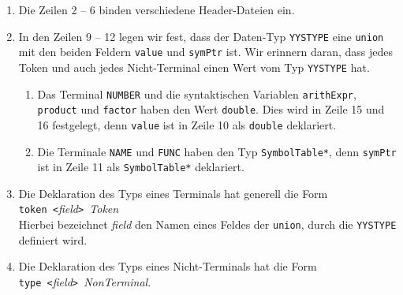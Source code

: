\begin{enumerate}
\item Die Zeilen 2 -- 6 binden verschiedene Header-Dateien ein.
\item In den Zeilen 9 -- 12 legen wir fest, dass der Daten-Typ \texttt{YYSTYPE} eine
      \texttt{union} mit den beiden Feldern \texttt{value} und \texttt{symPtr} ist.
      Wir erinnern daran, dass jedes Token und auch jedes Nicht-Terminal einen Wert vom
      Typ \texttt{YYSTYPE} hat.  
      \begin{enumerate}
      \item Das Terminal \texttt{NUMBER} und die syntaktischen Variablen
            \texttt{arithExpr}, \texttt{product} und \texttt{factor} haben den Wert
            \texttt{double}.  Dies wird in Zeile 15 und 16 festgelegt, denn \texttt{value}
            ist in Zeile 10 als \texttt{double} deklariert.
      \item Die Terminale \texttt{NAME} und \texttt{FUNC} haben den Typ
            \texttt{SymbolTable*}, denn \texttt{symPtr} ist in Zeile 11 als
            \texttt{SymbolTable*} deklariert.
      \end{enumerate}
\item Die Deklaration des Typs eines Terminals hat generell die Form
      \\[0.2cm]
      \hspace*{1.3cm}
      \texttt{token <}\textsl{field}\texttt{> }\textsl{Token}
      \\[0.2cm]
      Hierbei bezeichnet \textsl{field} den Namen eines Feldes der \texttt{union}, durch
      die \texttt{YYSTYPE} definiert wird.
\item Die Deklaration des Typs eines Nicht-Terminals hat die Form
      \\[0.2cm]
      \hspace*{1.3cm}
      \texttt{type <}\textsl{field}\texttt{> }\textsl{NonTerminal}.


\end{enumerate}
